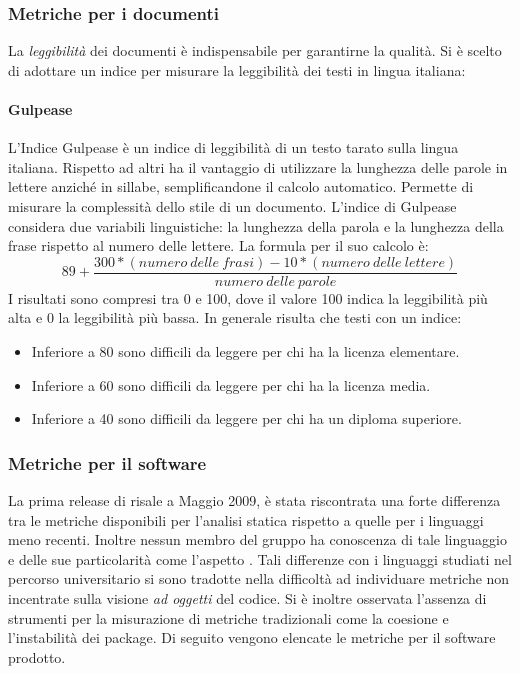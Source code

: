 		\subsubsection{Metriche per i documenti}
		La \emph{leggibilità} dei documenti è indispensabile per garantirne la qualità. Si è scelto di adottare un indice per misurare la leggibilità dei testi in lingua italiana:
			\paragraph{Gulpease}
			L'Indice Gulpease è un indice di leggibilità di un testo tarato sulla lingua italiana. Rispetto ad altri ha il vantaggio di utilizzare la lunghezza delle parole in lettere anziché in sillabe, semplificandone il calcolo automatico. Permette di misurare la complessità dello stile di un documento.
			L'indice di Gulpease considera due variabili linguistiche: la lunghezza della parola e la lunghezza della frase rispetto al numero delle lettere.
			La formula per il suo calcolo è: \\
			\[
			89 + \frac{300 * (numero\ delle\ frasi) - 10 * (numero\ delle\ lettere)}{numero\ delle\ parole}
			\]
			I risultati sono compresi tra 0 e 100, dove il valore 100 indica la leggibilità più alta e 0 la leggibilità più bassa. In generale risulta che testi con un indice:
			\begin{itemize}
				\item Inferiore a 80 sono difficili da leggere per chi ha la licenza elementare.
				\item Inferiore a 60 sono difficili da leggere per chi ha la licenza media.
				\item Inferiore a 40 sono difficili da leggere per chi ha un diploma superiore.
			\end{itemize}
			
		\subsubsection{Metriche per il software}
		La prima release di   risale a Maggio 2009, è stata riscontrata una forte differenza tra le metriche disponibili per l'analisi statica rispetto a quelle per i linguaggi meno recenti. Inoltre nessun membro del gruppo ha conoscenza di tale linguaggio e delle sue particolarità come l'aspetto . Tali differenze con i linguaggi studiati nel percorso universitario si sono tradotte nella difficoltà ad individuare metriche non incentrate sulla visione \emph{ad oggetti} del codice. Si è inoltre osservata l'assenza di strumenti per la misurazione di metriche tradizionali come la coesione e l'instabilità dei package.
		Di seguito vengono elencate le metriche per il software prodotto. 
		
